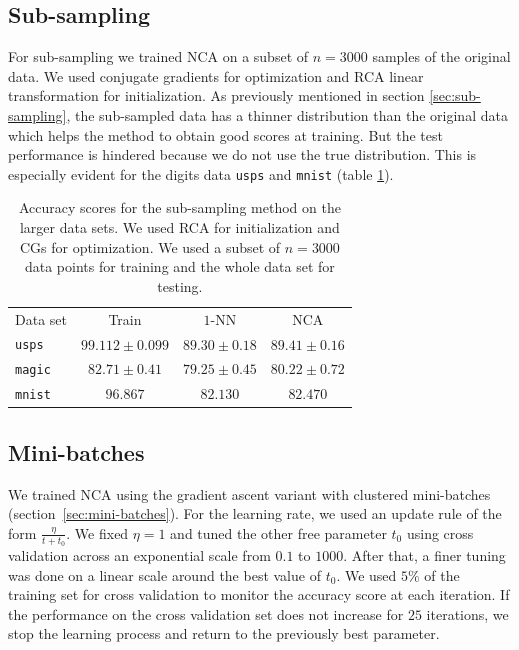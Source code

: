   \subsection{Sub-sampling}
  \label{subsec:eval-sub-sampling}

    For sub-sampling we trained NCA on a subset of $n=3000$ samples of the original data. We used conjugate gradients for optimization and RCA linear transformation for initialization. As previously mentioned in section \ref{sec:sub-sampling}, the sub-sampled data has a thinner distribution than the original data which helps the method to obtain good scores at training. But the test performance is hindered because we do not use the true distribution. This is especially evident for the digits data \texttt{usps} and \texttt{mnist} (table \ref{tab:ss}). 
    \begin{table}
    	\centering
    	\begin{tabular}{lccc}
    	\toprule
    	Data set & Train & $1$-NN & NCA \\
    	\cmidrule(r){2-2}\cmidrule(r){3-4}
    	 \texttt{usps}&$99.112 \pm 0.099$&$89.30 \pm 0.18$&$89.41 \pm 0.16$\\
    	 \texttt{magic}&$82.71 \pm 0.41$&$79.25 \pm 0.45$&$80.22 \pm 0.72$\\
    	 \texttt{mnist}&$96.867$&$82.130$&$82.470$\\
    	 \bottomrule
    	\end{tabular}
	\caption[Accuracy for the sub-sampling method on large data sets]{Accuracy scores for the sub-sampling method on the larger data sets. We used RCA for initialization and CGs for optimization. We used a subset of $n=3000$ data points for training and the whole data set for testing.}
	\label{tab:ss}
    \end{table}

    \subsection{Mini-batches}
    \label{subsec:eval-mini-batches}

    We trained NCA using the gradient ascent variant with clustered mini-batches (section~\ref{sec:mini-batches}). For the learning rate, we used an update rule of the form $\frac{\eta}{t+t_0}$. We fixed $\eta=1$ and tuned the other free parameter $t_0$ using cross validation across an exponential scale from $0.1$ to $1000$. After that, a finer tuning was done on a linear scale around the best value of $t_0$. We used $5\%$ of the training set for cross validation to monitor the accuracy score at each iteration. If the performance on the cross validation set does not increase for $25$ iterations, we stop the learning process and return to the previously best parameter.

